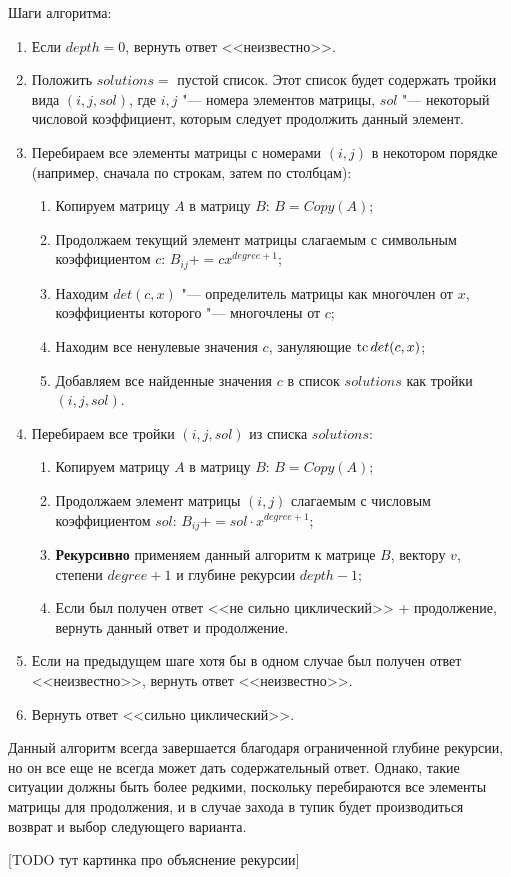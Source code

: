 Шаги алгоритма:
\begin{enumerate}
    \item
        Если $depth = 0$, вернуть ответ <<неизвестно>>.
    \item
        Положить $solutions = $ пустой список.
        Этот список будет содержать тройки вида $(i, j, sol)$,
        где $i, j$ "--- номера элементов матрицы, $sol$ "--- некоторый числовой коэффициент,
        которым следует продолжить данный элемент.
    \item
        Перебираем все элементы матрицы с номерами $(i, j)$ в некотором порядке (например, сначала по строкам, затем по столбцам):
        \begin{enumerate}
            \item
                Копируем матрицу $A$ в матрицу $B$: $B = Copy(A)$;
            \item
                Продолжаем текущий элемент матрицы слагаемым с символьным коэффициентом $c$:
                $B_{ij} += cx^{degree + 1}$;
            \item
                Находим $det(c, x)$ "--- определитель матрицы \diffMatrix[B] как многочлен от $x$,
                коэффициенты которого "--- многочлены от $c$;
            \item
                Находим все ненулевые значения $c$, зануляющие $\mathop{\rm tc} det(c, x)$;
            \item
                Добавляем все найденные значения $c$ в список $solutions$ как тройки $(i, j, sol)$.
        \end{enumerate}
    \item
        Перебираем все тройки $(i, j, sol)$ из списка $solutions$:
        \begin{enumerate}
            \item
                Копируем матрицу $A$ в матрицу $B$: $B = Copy(A)$;
            \item
                Продолжаем элемент матрицы $(i, j)$ слагаемым с числовым коэффициентом $sol$:
                $B_{ij} += sol \cdot x^{degree + 1}$;
            \item
                \textbf{Рекурсивно} применяем данный алгоритм
                к матрице $B$, вектору $v$, степени $degree + 1$ и глубине рекурсии $depth - 1$;
            \item
                Если был получен ответ <<не сильно циклический>> + продолжение, вернуть данный ответ и продолжение.
        \end{enumerate}
    \item
        Если на предыдущем шаге хотя бы в одном случае был получен ответ <<неизвестно>>, вернуть ответ <<неизвестно>>.
    \item
        Вернуть ответ <<сильно циклический>>.
\end{enumerate}

Данный алгоритм всегда завершается благодаря ограниченной глубине рекурсии,
но он все еще не всегда может дать содержательный ответ.
Однако, такие ситуации должны быть более редкими, поскольку перебираются все элементы матрицы для продолжения,
и в случае захода в тупик будет производиться возврат и выбор следующего варианта.

[TODO тут картинка про объяснение рекурсии]
